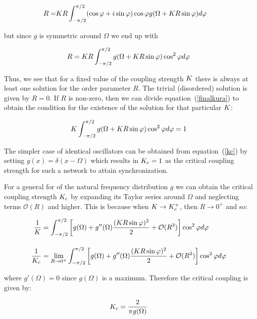 \begin{align}
     R = &K R\int_{-\pi/2}^{\pi/2} (\cos \varphi + i \sin \varphi ) \cos\varphi g(\Omega + K R \sin\varphi) d\varphi
\end{align}

\noindent but since $g$ is symmetric around $\Omega$ we end up with

\begin{align}
     R = K R\int_{-\pi/2}^{\pi/2} g(\Omega + K R \sin\varphi) \cos^2\varphi d\varphi
     \label{finalkura}
\end{align}

Thus, we see that for a fixed value of the coupling strength $K$ there is always at least one solution for the order parameter $R$.
The trivial (disordered) solution is given by $R=0$. If $R$ is non-zero, then we can divide equation~(\ref{finalkura}) to obtain the
condition for the existence of the solution for that particular $K$:

\begin{align}
     K\int_{-\pi/2}^{\pi/2} g(\Omega + K R \sin\varphi) \cos^2\varphi d\varphi = 1
     \label{kc}
\end{align}

The simpler case of identical oscillators can be obtained from equation~(\ref{kc}) by setting $g(x) = \delta(x-\Omega)$ which results
in $K_c = 1$ as the critical coupling strength for such a network to attain synchronization.

For a general for of the natural frequency distribution $g$ we can obtain the critical coupling strength $K_c$ by expanding its
Taylor series around $\Omega$ and neglecting terms $\mathcal{O}(R)$ and higher. This is because when $K \to K_c^+$, then $R \to
0^+$ and so:

\begin{align}
    \frac{1}{K} &= \int_{-\pi/2}^{\pi/2} \left[ g(\Omega) + g''(\Omega)\frac{(K R \sin\varphi)^2}{2} + \mathcal{O}(R^3) \right] \cos^2\varphi d\varphi \\[10pt]
    \frac{1}{K_c} &= \lim_{R\to0^+} \int_{-\pi/2}^{\pi/2} \left[ g(\Omega) + g''(\Omega)\frac{(K R \sin\varphi)^2}{2} + \mathcal{O}(R^3) \right] \cos^2\varphi d\varphi
\end{align}

\noindent where $g'(\Omega)=0$ since $g(\Omega)$ is a maximum. Therefore the critical coupling is given by:

\begin{align}
    K_c = \frac{2}{\pi g(\Omega)}
\end{align}

